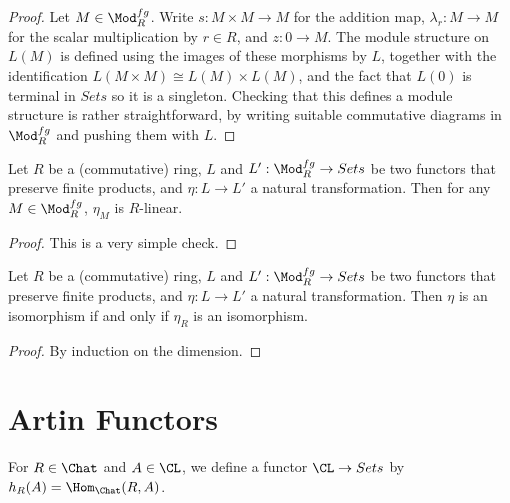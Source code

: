 \begin{proof}
  \leanok
  Let $M \in \Mod_R^{fg}$. Write $s : M \times M \to M$ for the addition
  map, $\lambda_r : M \to M$ for the scalar multiplication by $r \in R$,
  and $z : 0 \to M$.
  The module structure on $L(M)$ is defined using the images of these
  morphisms by $L$, together with the identification
  $L(M\times M) \cong L(M) \times L(M)$, and the fact that $L(0)$ is terminal
  in $Sets$ so it is a singleton.
  Checking that this defines a module structure is rather straightforward,
  by writing suitable commutative diagrams in $\Mod_R^{fg}$ and
  pushing them with $L$.
\end{proof}

\begin{lemma}
  \label{lem:vsnatlin}
  \leanok
  Let $R$ be a (commutative) ring, $L$ and $L' : \Mod_R^{fg} \to Sets$ be two
  functors that preserve finite products, and $\eta : L \to L'$ a natural
  transformation.
  Then for any $M \in \Mod_R^{fg}$, $\eta_M$ is $R$-linear.
\end{lemma}

\begin{proof}
  \leanok
  This is a very simple check.
\end{proof}

\begin{lemma}
  \label{lem:vsnatiso}
  \leanok
  Let $R$ be a (commutative) ring, $L$ and $L' : \Mod_R^{fg} \to Sets$ be two
  functors that preserve finite products, and $\eta : L \to L'$ a natural
  transformation.
  Then $\eta$ is an isomorphism if and only if
  $\eta_R$ is an isomorphism.
\end{lemma}

\begin{proof}
  By induction on the dimension.
\end{proof}

\section{Artin Functors}

\begin{definition}
  \label{def:hR}
  \leanok
  For $R \in \Chat$ and $A \in \CL$, we define a functor $\CL \to Sets$ by
  $h_R (A) = \Hom_{\Chat}(R, A)$.
\end{definition}

